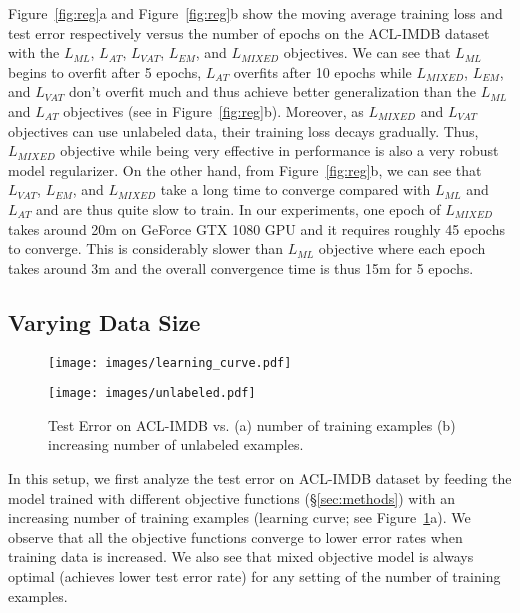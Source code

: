 \documentclass[letterpaper]{article}
\begin{document}
Figure~\ref{fig:reg}a and Figure~\ref{fig:reg}b show the moving average training loss and test error respectively versus the number of epochs on the ACL-IMDB dataset with the $L_{\textit{ML}}$, $L_{\textit{AT}}$, $L_{\textit{VAT}}$, $L_{\textit{EM}}$, and $L_{\textit{MIXED}}$ objectives. We can see
 that $L_{\textit{ML}}$ begins to overfit after 5 epochs, $L_{\textit{AT}}$ overfits after 10 epochs while $L_{\textit{MIXED}}$, $L_{\textit{EM}}$, and $L_{\textit{VAT}}$ don't overfit much and thus achieve better generalization than the $L_{\textit{ML}}$ and $L_{\textit{AT}}$ objectives (see in Figure~\ref{fig:reg}b). Moreover, as $L_{\textit{MIXED}}$ and $L_{\textit{VAT}}$ objectives can use unlabeled data, their training loss decays gradually.
Thus, $L_{\textit{MIXED}}$ objective while being very effective in performance is also a very robust model regularizer. On the other hand, from Figure~\ref{fig:reg}b, we can see that $L_{\textit{VAT}}$, $L_{\textit{EM}}$, and $L_{\textit{MIXED}}$ take a long time to converge compared with $L_{\textit{ML}}$ and $L_{\textit{AT}}$ and are thus quite slow to train. In our experiments, one epoch of $L_{\textit{MIXED}}$ takes around 20m on GeForce GTX 1080 GPU and it requires roughly 45 epochs to converge. This is considerably slower than $L_{\textit{ML}}$ objective where each epoch takes around 3m and the overall convergence time is thus 15m for 5 epochs.

\subsection{Varying Data Size}
\begin{figure}[!htp]
\begin{minipage}{0.5\linewidth}
\centering
\texttt{[image: images/learning\_curve.pdf]}
\end{minipage}\begin{minipage}{0.5\linewidth}
\centering
\texttt{[image: images/unlabeled.pdf]}
\end{minipage}
\caption{Test Error on ACL-IMDB vs. (a) number of training examples (b) increasing number of unlabeled examples.}
\label{fig:varying_data}
\end{figure}

In this setup, we first analyze the test error on ACL-IMDB dataset by feeding the model trained with different objective functions (\S\ref{sec:methods}) with an increasing number of training examples (learning curve; see Figure~\ref{fig:varying_data}a). We observe that all the objective functions converge to lower error rates when training data is increased. We also see that mixed objective model is always optimal (achieves lower test error rate) for any setting of the number of training examples.
\end{document}
